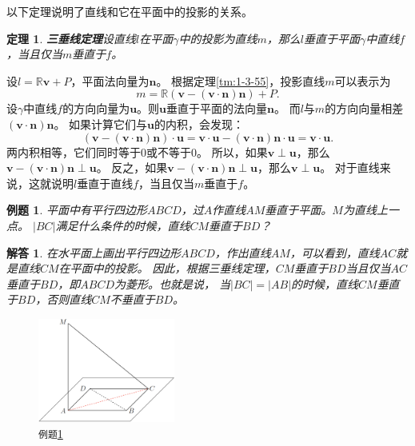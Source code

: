 \documentclass[12pt,UTF8]{ctexbook}
\newtheorem{tm}{定理}[section]
\newtheorem{et}{例题}[section]
\newtheorem*{so}{解答}
\begin{document}
以下定理说明了直线和它在平面中的投影的关系。
\begin{tm}{\textbf{三垂线定理}}\label{tm:1-3-57}
    设直线$l$在平面$\gamma$中的投影为直线$m$，那么$l$垂直于平面$\gamma$中直线$f$，当且仅当$m$垂直于$f$。
\end{tm}
\begin{proof2}
    设$l=\mathbb{R}\mathbf{v}+P$，平面法向量为$\mathbf{n}$。
    根据定理\ref{tm:1-3-55}，投影直线$m$可以表示为
    $$m = \mathbb{R}(\mathbf{v} - (\mathbf{v}\cdot\mathbf{n})\mathbf{n}) + P.$$
    设$\gamma$中直线$f$的方向向量为$\mathbf{u}$。则$\mathbf{u}$垂直于平面的法向量$\mathbf{n}$。
    而$l$与$m$的方向向量相差$(\mathbf{v}\cdot\mathbf{n})\mathbf{n}$。
    如果计算它们与$\mathbf{u}$的内积，会发现：
    $$ (\mathbf{v} - (\mathbf{v}\cdot\mathbf{n})\mathbf{n})\cdot \mathbf{u} = \mathbf{v} \cdot \mathbf{u} - (\mathbf{v}\cdot\mathbf{n})\mathbf{n} \cdot \mathbf{u} = \mathbf{v} \cdot \mathbf{u}. $$
    两内积相等，它们同时等于$0$或不等于$0$。
    所以，如果$\mathbf{v} \perp \mathbf{u}$，那么$\mathbf{v} - (\mathbf{v}\cdot\mathbf{n})\mathbf{n} \perp \mathbf{u}$。
    反之，如果$\mathbf{v} - (\mathbf{v}\cdot\mathbf{n})\mathbf{n} \perp \mathbf{u}$，那么$\mathbf{v} \perp \mathbf{u}$。
    对于直线来说，这就说明$l$垂直于直线$f$，当且仅当$m$垂直于$f$。
\end{proof2}

\begin{et}\label{et:1-3-10}
    平面中有平行四边形$ABCD$，过$A$作直线$AM$垂直于平面。$M$为直线上一点。
    $|BC|$满足什么条件的时候，直线$CM$垂直于$BD$？
\end{et}
\begin{so}
    在水平面上画出平行四边形$ABCD$，作出直线$AM$，可以看到，直线$AC$就是直线$CM$在平面中的投影。
    因此，根据三垂线定理，$CM$垂直于$BD$当且仅当$AC$垂直于$BD$，即$ABCD$为菱形。也就是说，
    当$|BC|=|AB|$的时候，直线$CM$垂直于$BD$，否则直线$CM$不垂直于$BD$。
\end{so}

\begin{figure} %
    \vspace{-45pt}
    \flushright
    \includegraphics[width=0.4\textwidth]{垂线例10.png}
    \caption*{\texttt{例题}\ref{et:1-3-10}}
\end{figure}
\end{document}
